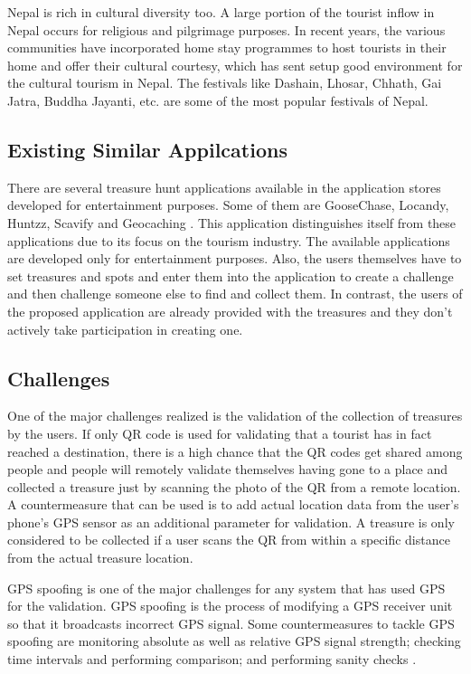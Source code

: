 \documentclass[12pt, a4paper, oneside]{article}
\begin{document}
Nepal is rich in cultural diversity too. A large portion of the tourist inflow in Nepal occurs for religious and pilgrimage purposes. In recent years, the various communities have incorporated home stay programmes to host tourists in their home and offer their cultural courtesy, which has sent setup good environment for the cultural tourism in Nepal. The festivals like Dashain, Lhosar, Chhath, Gai Jatra, Buddha Jayanti, etc. are some of the most popular festivals of Nepal.

\subsection{Existing Similar Appilcations}
There are several treasure hunt applications available in the application stores developed for entertainment purposes. Some of them are GooseChase, Locandy, Huntzz, Scavify and Geocaching \cite{similarapps}. This application distinguishes itself from these applications due to its focus on the tourism industry. The available applications are developed only for entertainment purposes. Also, the users themselves have to set treasures and spots and enter them into the application to create a challenge and then challenge someone else to find and collect them. In contrast, the users of the proposed application are already provided with the treasures and they don't actively take participation in creating one.

\subsection{Challenges}
One of the major challenges realized is the validation of the collection of treasures by the users. If only QR code is used for validating that a tourist has in fact reached a destination, there is a high chance that the QR codes get shared among people and people will remotely validate themselves having gone to a place and collected a treasure just by scanning the photo of the QR from a remote location. A countermeasure that can be used is to add actual location data from the user's phone's GPS sensor as an additional parameter for validation. A treasure is only considered to be collected if a user scans the QR from within a specific distance from the actual treasure location.

GPS spoofing is one of the major challenges for any system that has used GPS for the validation. GPS spoofing is the process of modifying a GPS receiver unit so that it broadcasts incorrect GPS signal. Some countermeasures to tackle GPS spoofing are monitoring absolute as well as relative GPS signal strength; checking time intervals and performing comparison; and performing sanity checks \cite{gpsspoofmeasures}.
\end{document}
